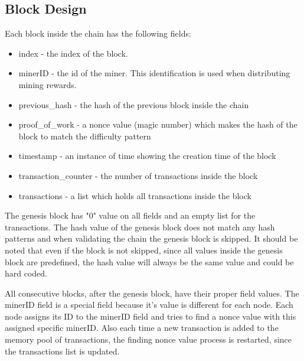 \documentclass[12pt]{article}
\begin{document}
\subsection{Block Design} %

Each block inside the chain has the following fields:

\begin{itemize}
  \item index - the index of the block.
  \item minerID - the id of the miner. This identification is used when distributing mining rewards.
  \item previous\_hash - the hash of the previous block inside the chain
  \item proof\_of\_work - a nonce value (magic number) which makes the hash of the block to match the difficulty pattern
  \item timestamp - an instance of time showing the creation time of the block
  \item transaction\_counter - the number of transactions inside the block
  \item transactions - a list which holds all transactions inside the block
\end{itemize}

The genesis block has "0" value on all fields and an empty list for the transactions. The hash value of the genesis block does not match any hash patterns and when validating the chain the genesis block is skipped. It should be noted that even if the block is not skipped, since all values inside the genesis block are predefined, the hash value will always be the same value and could be hard coded.

All consecutive blocks, after the genesis block, have their proper field values. The minerID field is a special field because it's value is different for each node. Each node assigns its ID to the minerID field and tries to find a nonce value with this assigned specific minerID. Also each time a new transaction is added to the memory pool of transactions, the finding nonce value process is restarted, since the transactions list is updated.
\end{document}
